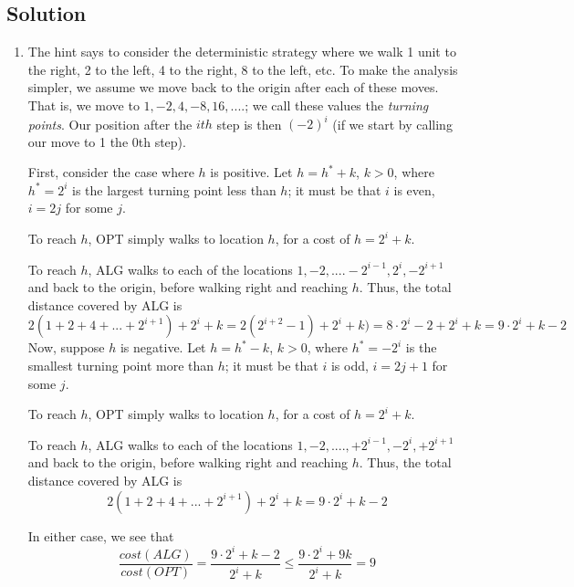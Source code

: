 \documentclass{article}
\begin{document}
\subsection*{Solution}
  \begin{enumerate}
  \item The hint says to consider the deterministic strategy where we walk 1 unit to the right, 2 to the left, 4 to the right, 8 to the left, etc. To make the analysis simpler, we assume we move back to the origin after each of these moves. That is, we move to $1, -2, 4, -8, 16, ....$; we call these values the {\it turning points}. Our position after the $ith$ step is then $(-2)^i$ (if we start by calling our move to 1 the 0th step). 
      
      First, consider the case where $h$ is positive. Let $h = h^* + k$, $k > 0$, where $h^* = 2^i$ is the largest turning point less than $h$; it must be that $i$ is even, $i = 2j$ for some $j$. 
      
      To reach $h$, OPT simply walks to location $h$, for a cost of $h = 2^i + k$. 
      
      To reach $h$, ALG walks to each of the locations $1,-2,.... -2^{i-1}, 2^i, -2^{i+1}$ and back to the origin, before walking right and reaching $h$. Thus, the total distance covered by ALG is
      $$ 2 ( 1 + 2 + 4 + ... + 2^{i+1}) + 2^i + k = 2 ( 2^{i+2} - 1) + 2^i + k) = 8 \cdot 2^i -2 + 2^i + k = 9\cdot 2^i+k-2 $$
    Now, suppose $h$ is negative. Let $h = h^* - k$, $k > 0$, where $h^* = -2^i$ is the smallest turning point more than $h$; it must be that $i$ is odd, $i = 2j + 1$ for some $j$. 
    
    To reach $h$, OPT simply walks to location $h$, for a cost of $h = 2^i + k$. 
    
    To reach $h$, ALG walks to each of the locations $1,-2,.... ,+2^{i-1}, -2^i, +2^{i+1}$ and back to the origin, before walking right and reaching $h$. Thus, the total distance covered by ALG is
    $$ 2 ( 1 + 2 + 4 + ... + 2^{i+1}) + 2^i + k = 9 \cdot 2^i +k-2  $$
            
    In either case, we see that $$\frac{cost(ALG)}{cost(OPT)} = \frac{9 \cdot 2^i +k-2}{2^i + k} \leq \frac{9 \cdot 2^i +9k}{2^i + k} = 9$$
  


\end{enumerate}
\end{document}
